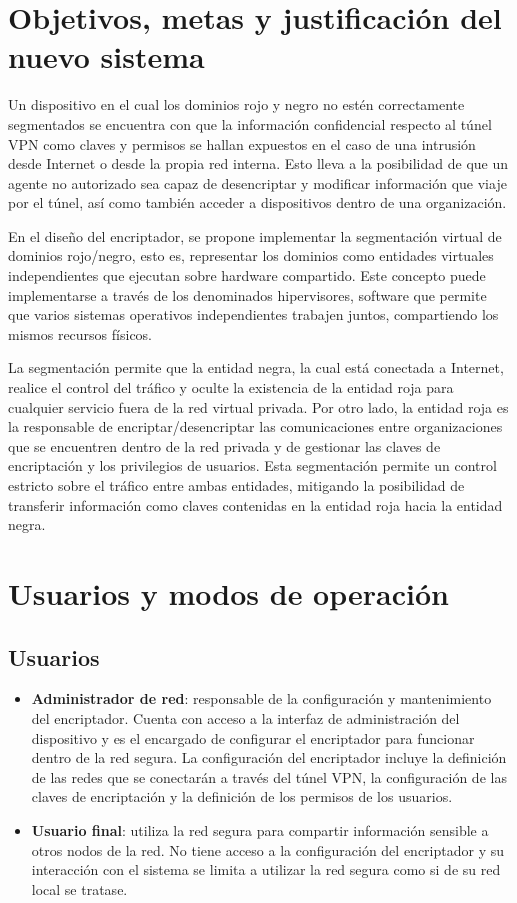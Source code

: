 \documentclass[12pt]{article}
\begin{document}
\section{Objetivos, metas y justificación del nuevo sistema}

Un dispositivo en el cual los dominios rojo y negro no estén correctamente segmentados se encuentra con que la información confidencial respecto al túnel VPN como claves y permisos se hallan expuestos en el caso de una intrusión desde Internet o desde la propia red interna. Esto lleva a la posibilidad de que un agente no autorizado sea capaz de desencriptar y modificar información que viaje por el túnel, así como también acceder a dispositivos dentro de una organización.

En el diseño del encriptador, se propone implementar la segmentación virtual de dominios rojo/negro, esto es, representar los dominios como entidades virtuales independientes que ejecutan sobre hardware compartido. Este concepto puede implementarse a través de los denominados hipervisores, software que permite que varios sistemas operativos independientes trabajen juntos, compartiendo los mismos recursos físicos.

La segmentación permite que la entidad negra, la cual está conectada a Internet, realice el control del tráfico y oculte la existencia de la entidad roja para cualquier servicio fuera de la red virtual privada. Por otro lado, la entidad roja es la responsable de encriptar/desencriptar las comunicaciones entre organizaciones que se encuentren dentro de la red privada y de gestionar las claves de encriptación y los privilegios de usuarios. Esta segmentación permite un control estricto sobre el tráfico entre ambas entidades, mitigando la posibilidad de transferir información como claves contenidas en la entidad roja hacia la entidad negra.

\newpage

\section{Usuarios y modos de operación}
\subsection{Usuarios}
\begin{itemize}
    \item \textbf{Administrador de red}: responsable de la configuración y mantenimiento del encriptador. Cuenta con acceso a la interfaz de administración del dispositivo y es el encargado de configurar el encriptador para funcionar dentro de la red segura. La configuración del encriptador incluye la definición de las redes que se conectarán a través del túnel VPN, la configuración de las claves de encriptación y la definición de los permisos de los usuarios.
    \item \textbf{Usuario final}: utiliza la red segura para compartir información sensible a otros nodos de la red. No tiene acceso a la configuración del encriptador y su interacción con el sistema se limita a utilizar la red segura como si de su red local se tratase.
\end{itemize}
\end{document}
